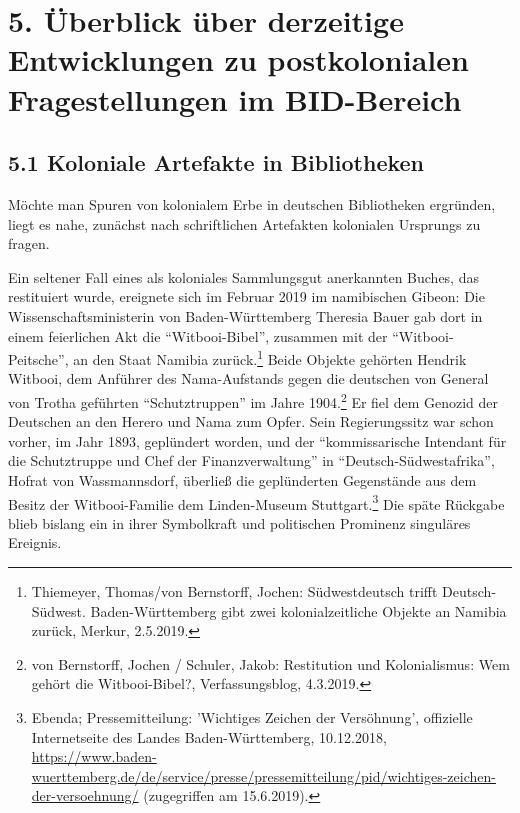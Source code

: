 \documentclass[a4paper,
fontsize=11pt,
oneside,
numbers=noperiodatend,
parskip=half-,
bibliography=totoc,
final
]{scrartcl}
\begin{document}
\hypertarget{uxfcberblick-uxfcber-derzeitige-entwicklungen-zu-postkolonialen-fragestellungen-im-bid-bereich}{%
\section{5. Überblick über derzeitige Entwicklungen zu
postkolonialen Fragestellungen im
BID-Bereich}\label{uxfcberblick-uxfcber-derzeitige-entwicklungen-zu-postkolonialen-fragestellungen-im-bid-bereich}}

\hypertarget{koloniale-artefakte-in-bibliotheken}{%
\subsection{5.1 Koloniale Artefakte in
Bibliotheken}\label{koloniale-artefakte-in-bibliotheken}}

Möchte man Spuren von kolonialem Erbe in deutschen Bibliotheken
ergründen, liegt es nahe, zunächst nach schriftlichen Artefakten
kolonialen Ursprungs zu fragen.

Ein seltener Fall eines als koloniales Sammlungsgut anerkannten Buches,
das restituiert wurde, ereignete sich im Februar 2019 im namibischen
Gibeon: Die Wissenschaftsministerin von Baden-Württemberg Theresia Bauer
gab dort in einem feierlichen Akt die \enquote{Witbooi-Bibel}, zusammen
mit der \enquote{Witbooi-Peitsche}, an den Staat Namibia
zurück.\footnote{Thiemeyer, Thomas/von Bernstorff, Jochen:
  Südwestdeutsch trifft Deutsch-Südwest. Baden-Württemberg gibt zwei
  kolonialzeitliche Objekte an Namibia zurück, Merkur, 2.5.2019.} Beide
Objekte gehörten Hendrik Witbooi, dem Anführer des Nama-Aufstands gegen
die deutschen von General von Trotha geführten \enquote{Schutztruppen}
im Jahre 1904.\footnote{von Bernstorff, Jochen / Schuler, Jakob:
  Restitution und Kolonialismus: Wem gehört die Witbooi-Bibel?,
  Verfassungsblog, 4.3.2019.} Er fiel dem Genozid der Deutschen an den
Herero und Nama zum Opfer. Sein Regierungssitz war schon vorher, im Jahr
1893, geplündert worden, und der \enquote{kommissarische Intendant für
die Schutztruppe und Chef der Finanzverwaltung} in
\enquote{Deutsch-Südwestafrika}, Hofrat von Wassmannsdorf, überließ die
geplünderten Gegenstände aus dem Besitz der Witbooi-Familie dem
Linden-Museum Stuttgart.\footnote{Ebenda; Pressemitteilung: 'Wichtiges
  Zeichen der Versöhnung', offizielle Internetseite des Landes
  Baden-Württemberg, 10.12.2018,
  \url{https://www.baden-wuerttemberg.de/de/service/presse/pressemitteilung/pid/wichtiges-zeichen-der-versoehnung/}
  (zugegriffen am 15.6.2019).} Die späte Rückgabe blieb bislang ein in
ihrer Symbolkraft und politischen Prominenz singuläres Ereignis.
\end{document}
